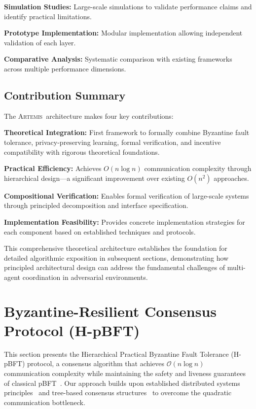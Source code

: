 \documentclass[conference]{IEEEtran}
\newcommand{\artemis}{\textsc{Artemis}}
\newcommand{\bigO}{\mathcal{O}}
\begin{document}
\textbf{Simulation Studies:} Large-scale simulations to validate performance claims and identify practical limitations.

\textbf{Prototype Implementation:} Modular implementation allowing independent validation of each layer.

\textbf{Comparative Analysis:} Systematic comparison with existing frameworks across multiple performance dimensions.

\subsection{Contribution Summary}

The \artemis\ architecture makes four key contributions:

\textbf{Theoretical Integration:} First framework to formally combine Byzantine fault tolerance, privacy-preserving learning, formal verification, and incentive compatibility with rigorous theoretical foundations.

\textbf{Practical Efficiency:} Achieves $O(n \log n)$ communication complexity through hierarchical design—a significant improvement over existing $O(n^2)$ approaches.

\textbf{Compositional Verification:} Enables formal verification of large-scale systems through principled decomposition and interface specification.

\textbf{Implementation Feasibility:} Provides concrete implementation strategies for each component based on established techniques and protocols.

This comprehensive theoretical architecture establishes the foundation for detailed algorithmic exposition in subsequent sections, demonstrating how principled architectural design can address the fundamental challenges of multi-agent coordination in adversarial environments.

% 
% 
% 

\section{Byzantine-Resilient Consensus Protocol (H-pBFT)}

This section presents the Hierarchical Practical Byzantine Fault Tolerance (H-pBFT) protocol, a consensus algorithm that achieves $\bigO(n \log n)$ communication complexity while maintaining the safety and liveness guarantees of classical pBFT~\cite{castro1999practical}. Our approach builds upon established distributed systems principles~\cite{lynch1996distributed} and tree-based consensus structures~\cite{bracha1987asynchronous} to overcome the quadratic communication bottleneck.
\end{document}
